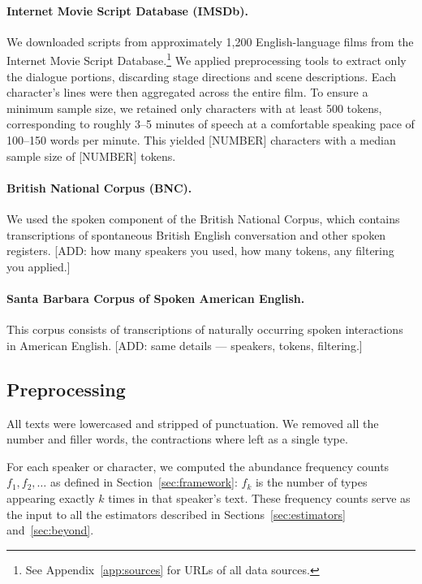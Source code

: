 \documentclass{article}
\begin{document}
\paragraph{Internet Movie Script Database (IMSDb).} We downloaded scripts 
from approximately 1,200 English-language films from the Internet Movie 
Script Database.\footnote{See Appendix~\ref{app:sources} for URLs of all 
data sources.} We applied preprocessing tools to extract only the dialogue 
portions, discarding stage directions and scene descriptions. Each 
character's lines were then aggregated across the entire film. To ensure a 
minimum sample size, we retained only characters with at least 500 tokens, 
corresponding to roughly 3--5 minutes of speech at a comfortable speaking 
pace of 100--150 words per minute. This yielded [NUMBER] characters with a 
median sample size of [NUMBER] tokens.

\paragraph{British National Corpus (BNC).} We used the spoken component of 
the British National Corpus, which contains transcriptions of spontaneous 
British English conversation and other spoken registers. [ADD: how many 
speakers you used, how many tokens, any filtering you applied.]

\paragraph{Santa Barbara Corpus of Spoken American English.} This corpus 
consists of transcriptions of naturally occurring spoken interactions in 
American English. [ADD: same details --- speakers, tokens, filtering.]

\subsection{Preprocessing}

All texts were lowercased and stripped of punctuation. We removed all the number and filler words, the contractions where left as a single type.

For each speaker or character, we computed the abundance frequency counts 
$f_1, f_2, \ldots$ as defined in Section~\ref{sec:framework}: $f_k$ is the 
number of types appearing exactly $k$ times in that speaker's text. These 
frequency counts serve as the input to all the estimators described in 
Sections~\ref{sec:estimators} and~\ref{sec:beyond}.
\end{document}
